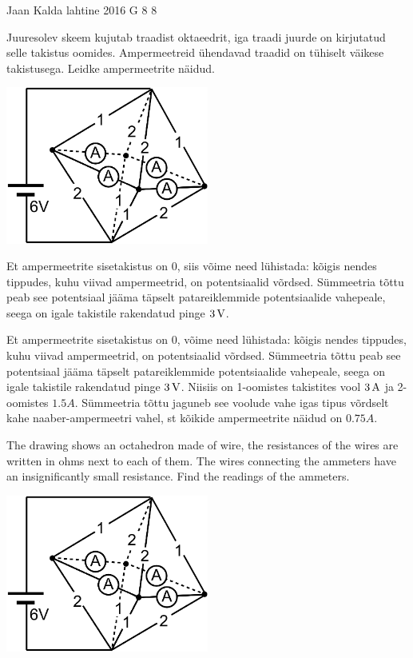 {Jaan Kalda} %
{lahtine} %
{2016} %
{G 8} %
{8} %
{
\ifStatement
Juuresolev skeem kujutab traadist oktaeedrit, iga traadi juurde on kirjutatud selle takistus oomides. 
Ampermeetreid ühendavad traadid on tühiselt väikese takistusega.
Leidke ampermeetrite näidud.

\begin{center}
\includegraphics[width=0.5\textwidth]{2016-lahg-08-ampermeeterjoonis.png}
\end{center}
\fi


\ifHint
Et ampermeetrite sisetakistus on \num{0}, siis võime need lühistada: kõigis nendes tippudes, kuhu viivad ampermeetrid, on potentsiaalid võrdsed. Sümmeetria tõttu peab see 
potentsiaal jääma täpselt patareiklemmide potentsiaalide vahepeale, seega on igale takistile rakendatud pinge
$\SI 3V$.
\fi


\ifSolution
Et ampermeetrite sisetakistus on \num{0}, võime need lühistada: kõigis nendes tippudes, kuhu viivad ampermeetrid, on potentsiaalid võrdsed. Sümmeetria tõttu peab see 
potentsiaal jääma täpselt patareiklemmide potentsiaalide vahepeale, seega on igale takistile rakendatud pinge
$\SI 3V$. Niisiis on 1-oomistes takistites vool $\SI 3A$ ja 2-oomistes $\SI {1.5}A$. Sümmeetria tõttu 
jaguneb see voolude vahe igas tipus võrdselt kahe naaber-ampermeetri vahel, st kõikide ampermeetrite näidud on 
$\SI {0.75}A$.
\fi


\ifEngStatement
The drawing shows an octahedron made of wire, the resistances of the wires are written in ohms next to each of them. The wires connecting the ammeters have an insignificantly small resistance. Find the readings of the ammeters.
\begin{center}
\includegraphics[width=0.5\textwidth]{2016-lahg-08-ampermeeterjoonis}
\end{center}
\fi


}
